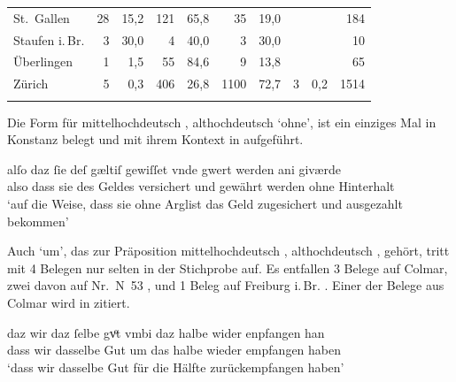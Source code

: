 \begin{table}
\begin{tabular}{
	l @{\qquad}
	r r @{\qquad}
	r r @{\qquad}
	r r @{\qquad}
	r r @{\qquad}
	r}
St.~Gallen
	& 28	& 15,2
	& 121	& 65,8
	& 35	& 19,0
	&		&
	& 184
	\\

Staufen i.\,Br.
	& 3 & 30,0
	& 4	& 40,0
	& 3	& 30,0
	&	&
	& 10
	\\

Überlingen
	& 1		& 1,5	
	& 55	& 84,6
	& 9		& 13,8
	&		&
	& 65
	\\

Zürich
	& 5		& 0,3
	& 406	& 26,8
	& 1100	& 72,7
	& 3		& 0,2
	& 1514
	\\

\lspbottomrule
\end{tabular}
\label{tab:ispelx}
\end{table}

Die Form  für mittelhochdeutsch ,
althochdeutsch  `ohne', ist ein einziges Mal in
Konstanz belegt und mit ihrem Kontext in  aufgeführt.

\begin{exe}
\ex\label{ex:konst_ani}
	\gll alſo daz ſie deſ gæltiſ gewiſſet vnde gwert werden ani giværde \\
		also dass sie des Geldes versichert und gewährt werden ohne
			Hinterhalt \\
	\trans `auf die Weise, dass sie ohne Arglist das Geld zugesichert und
		ausgezahlt bekommen'
		\parencites(Nr.~17, Konstanz, 1251)[26,22]{cao1}
\end{exe}

Auch  `um', das zur Präposition
mittelhochdeutsch ,
althochdeutsch , gehört, tritt mit 4 Belegen nur
selten in der Stichprobe auf. Es entfallen 3 Belege auf Colmar, zwei davon auf
Nr.~N~53 \autocites(Colmar, 1264)[37,2--17]{cao5}, und 1 Beleg auf Freiburg
i.\,Br. \autocites(Nr.~2580, Freiburg i.\,Br., 1297)[9,21--33]{cao4}. Einer der
Belege aus Colmar wird in  zitiert.

\begin{exe}
\ex\label{ex:col_umbi}
	\gll daz wir {daz ſelbe} gvͦt vmbi daz halbe wider enpfangen han \\
		dass wir dasselbe Gut um das halbe wieder empfangen haben \\
	\trans `dass wir dasselbe Gut für die Hälfte  zurückempfangen haben'
		\parencites(Nr.~N~92, Colmar, 1269)[64,27--28]{cao5}
\end{exe}

